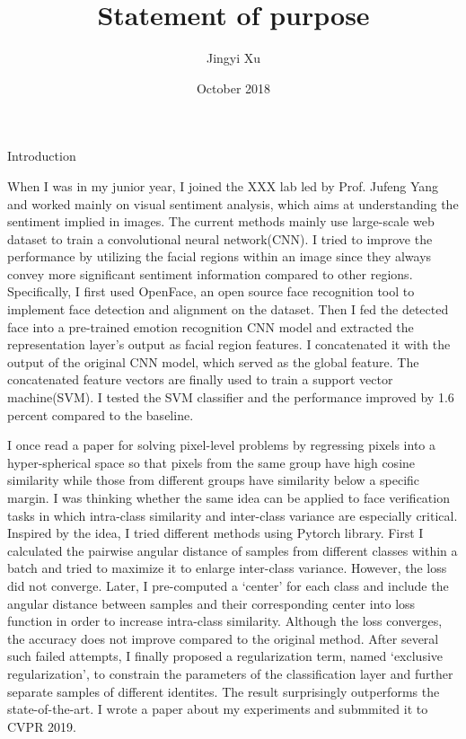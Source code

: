 \documentclass{article}
\title{Statement of purpose}
\author{Jingyi Xu}
\date{October 2018}
\begin{document}
\begin{Large}
\maketitle

\par{Introduction}
\par{When I was in my junior year, I joined the XXX lab led by Prof. Jufeng Yang and worked mainly on visual sentiment analysis, which aims at understanding the sentiment implied in images. The current methods mainly use large-scale web dataset to train a convolutional neural network(CNN). I tried to improve the performance by utilizing the facial regions within an image since they always convey more significant sentiment information compared to other regions.  Specifically, I first used OpenFace, an open source face recognition tool to implement face detection and alignment on the dataset. Then I fed the detected face into a pre-trained emotion recognition CNN model and extracted the representation layer’s output as facial region features. I concatenated it with the output of the original CNN model, which served as the global feature. The concatenated feature vectors are finally used to train a support vector machine(SVM). I tested the SVM classifier and the performance improved by 1.6 percent compared to the baseline.}
\par{I once read a paper for solving pixel-level problems by regressing pixels into a hyper-spherical space so that pixels from the same group have high cosine similarity while those from different groups have similarity below a specific margin.  I was thinking whether the same idea can be applied to face verification tasks in which intra-class similarity and inter-class variance are especially critical. Inspired by the idea, I tried different methods using Pytorch library. First I calculated the pairwise angular distance of samples from different classes within a batch and tried to maximize it to enlarge inter-class variance. However, the loss did not converge. Later, I pre-computed a ‘center’ for each class and include the angular distance between samples and their corresponding center into loss function in order to increase intra-class similarity. Although the loss converges, the accuracy does not improve compared to the original method. After several such failed attempts, I finally proposed a regularization term, named ‘exclusive regularization’, to constrain the parameters of the classification layer and further separate samples of different identites. The result surprisingly outperforms the state-of-the-art. I wrote a paper about my experiments and submmited it to CVPR 2019.}

\end{Large}
\end{document}
